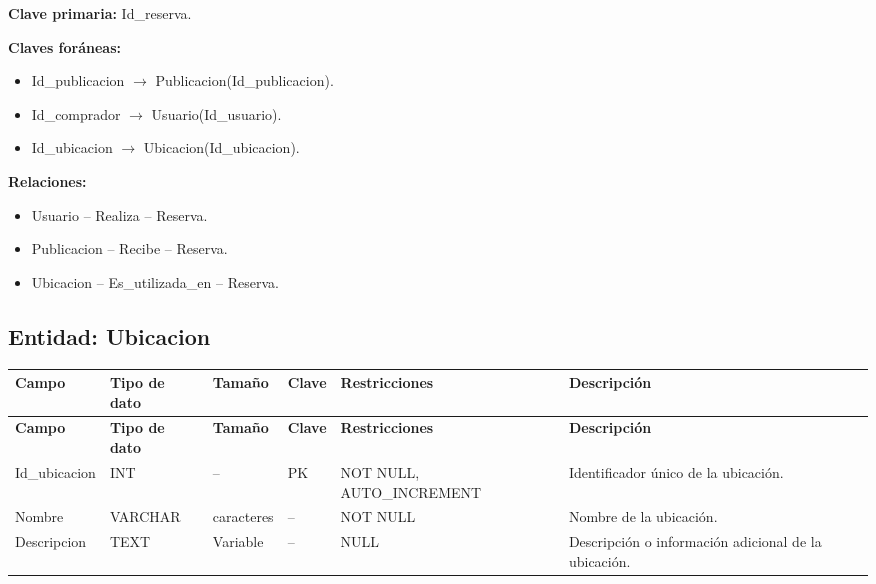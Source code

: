 \documentclass[12pt]{article} %
\begin{document}
\textbf{Clave primaria:} Id\_reserva.

\textbf{Claves foráneas:}
\begin{itemize}
    \item Id\_publicacion $\rightarrow$ Publicacion(Id\_publicacion).
    \item Id\_comprador $\rightarrow$ Usuario(Id\_usuario).
    \item Id\_ubicacion $\rightarrow$ Ubicacion(Id\_ubicacion).
\end{itemize}

\textbf{Relaciones:}
\begin{itemize}
    \item Usuario -- Realiza -- Reserva.
    \item Publicacion -- Recibe -- Reserva.
    \item Ubicacion -- Es\_utilizada\_en -- Reserva.
\end{itemize}



\subsection{Entidad: Ubicacion}

\begin{longtable}{>{\raggedright\arraybackslash}p{2.5cm}
                  >{\raggedright\arraybackslash}p{2.0cm}
                  >{\raggedright\arraybackslash}p{2.2cm}
                  >{\raggedright\arraybackslash}p{1.2cm}
                  >{\raggedright\arraybackslash}p{3.0cm}
                  >{\raggedright\arraybackslash}p{4.0cm}}
\toprule
\textbf{Campo} &
\textbf{Tipo de dato} &
\textbf{Tamaño} &
\textbf{Clave} &
\textbf{Restricciones} &
\textbf{Descripción} \\
\midrule
\endfirsthead

\toprule
\textbf{Campo} &
\textbf{Tipo de dato} &
\textbf{Tamaño} &
\textbf{Clave} &
\textbf{Restricciones} &
\textbf{Descripción} \\
\midrule
\endhead

Id\_ubicacion &
INT &
-- &
PK &
NOT NULL, AUTO\_INCREMENT &
Identificador único de la ubicación. \\

Nombre &
VARCHAR &
100 caracteres &
-- &
NOT NULL &
Nombre de la ubicación. \\

Descripcion &
TEXT &
Variable &
-- &
NULL &
Descripción o información adicional de la ubicación. \\

\bottomrule
\end{longtable}
\end{document}

